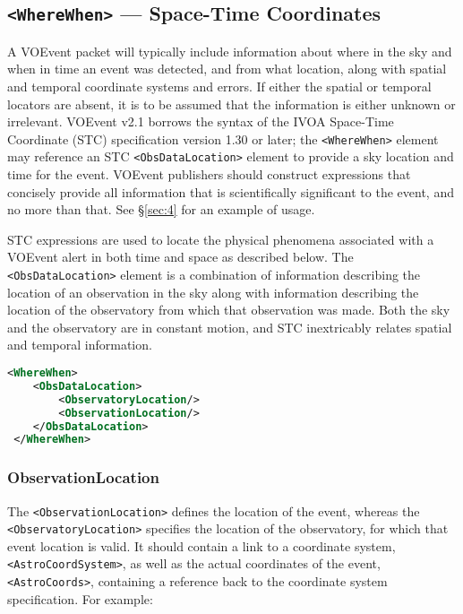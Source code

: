 \documentclass[11pt,a4paper]{ivoa}
\begin{document}
\subsection{\texttt{<WhereWhen>} --- Space-Time Coordinates}
\label{sec:3.4}

A VOEvent packet will typically include information about where in the sky and
when in time an event was detected, and from what location, along with spatial
and temporal coordinate systems and errors. If either the spatial or temporal
locators are absent, it is to be assumed that the information is either unknown
or irrelevant. VOEvent v2.1 borrows the syntax of the IVOA Space-Time Coordinate
(STC) specification version 1.30 or later; the \verb|<WhereWhen>| element may
reference an STC \citep{2007ivoa.spec.1030R} \verb|<ObsDataLocation>| element to
provide a sky location and time for the event. VOEvent publishers should
construct expressions that concisely provide all information that is
scientifically significant to the event, and no more than that. See
\S\ref{sec:4} for an example of usage.

STC expressions are used to locate the physical phenomena associated with a
VOEvent alert in both time and space as described below. The
\verb|<ObsDataLocation>| element is a combination of information describing the
location of an observation in the sky along with information describing the
location of the observatory from which that observation was made. Both the sky
and the observatory are in constant motion, and STC inextricably relates spatial
and temporal information.

\begin{lstlisting}[language=XML]
<WhereWhen>
    <ObsDataLocation>
        <ObservatoryLocation/>
        <ObservationLocation/>
    </ObsDataLocation>
 </WhereWhen>
\end{lstlisting}

\subsubsection{ObservationLocation}
\label{sec:3.4.1}

The \verb|<ObservationLocation>| defines the location of the event, whereas
the \verb|<ObservatoryLocation>| specifies the location of the observatory,
for which that event location is valid. It should contain a link to a
coordinate system, \verb|<AstroCoordSystem>|, as well as the actual coordinates
of the event, \verb|<AstroCoords>|, containing a reference back to the
coordinate system specification. For example:
\end{document}
